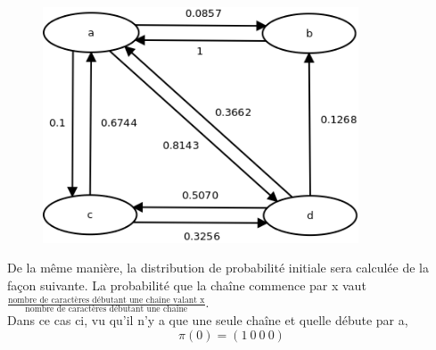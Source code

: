 \documentclass[11pt]{report}
\begin{document}
\begin{figure}[!h]
\begin{center}
\includegraphics[height = 7cm]{diagramme_etat.png}
\caption{\label{etat}}
\end{center}
\end{figure}
De la même manière, la distribution de probabilité initiale sera calculée de la façon suivante. La probabilité que la chaîne commence par x vaut $\frac{\mbox{nombre de caractères débutant une chaîne valant x}}{\mbox{nombre de caractères débutant une chaîne}}$.\\
Dans ce cas ci, vu qu'il n'y a que une seule chaîne et quelle débute par a,
$$\pi(0) = (1\ 0\ 0\ 0)$$
\end{document}
